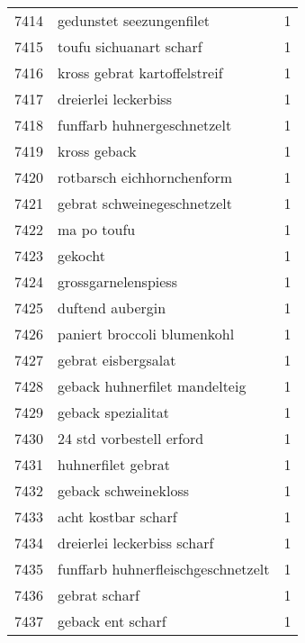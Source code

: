 \begin{tabular}{llr}
7414 &                           gedunstet seezungenfilet &      1 \\
7415 &                            toufu sichuanart scharf &      1 \\
7416 &                       kross gebrat kartoffelstreif &      1 \\
7417 &                               dreierlei leckerbiss &      1 \\
7418 &                        funffarb huhnergeschnetzelt &      1 \\
7419 &                                       kross geback &      1 \\
7420 &                         rotbarsch eichhornchenform &      1 \\
7421 &                        gebrat schweinegeschnetzelt &      1 \\
7422 &                                        ma po toufu &      1 \\
7423 &                                            gekocht &      1 \\
7424 &                                grossgarnelenspiess &      1 \\
7425 &                                   duftend aubergin &      1 \\
7426 &                        paniert broccoli blumenkohl &      1 \\
7427 &                                gebrat eisbergsalat &      1 \\
7428 &                      geback huhnerfilet mandelteig &      1 \\
7429 &                                 geback spezialitat &      1 \\
7430 &                           24 std vorbestell erford &      1 \\
7431 &                                 huhnerfilet gebrat &      1 \\
7432 &                               geback schweinekloss &      1 \\
7433 &                                acht kostbar scharf &      1 \\
7434 &                        dreierlei leckerbiss scharf &      1 \\
7435 &                 funffarb huhnerfleischgeschnetzelt &      1 \\
7436 &                                      gebrat scharf &      1 \\
7437 &                                  geback ent scharf &      1 \\

\end{tabular}
